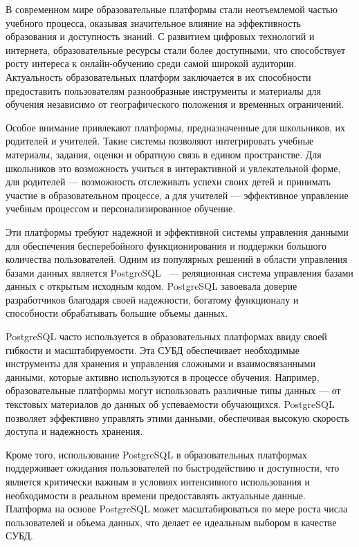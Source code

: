 \introduction %

В современном мире образовательные платформы стали неотъемлемой частью учебного процесса, оказывая значительное влияние на эффективность образования и доступность знаний. С развитием цифровых технологий и интернета, образовательные ресурсы стали более доступными, что способствует росту интереса к онлайн-обучению среди самой широкой аудитории. Актуальность образовательных платформ заключается в их способности предоставить пользователям разнообразные инструменты и материалы для обучения независимо от географического положения и временных ограничений.

Особое внимание привлекают платформы, предназначенные для школьников, их родителей и учителей. Такие системы позволяют интегрировать учебные материалы, задания, оценки и обратную связь в едином пространстве. Для школьников это возможность учиться в интерактивной и увлекательной форме, для родителей — возможность отслеживать успехи своих детей и принимать участие в образовательном процессе, а для учителей — эффективное управление учебным процессом и персонализированное обучение.

Эти платформы требуют надежной и эффективной системы управления данными для обеспечения бесперебойного функционирования и поддержки большого количества пользователей. Одним из популярных решений в области управления базами данных является PostgreSQL~\cite{postgresql} — реляционная система управления базами данных с открытым исходным кодом. PostgreSQL завоевала доверие разработчиков благодаря своей надежности, богатому функционалу и способности обрабатывать большие объемы данных.

PostgreSQL часто используется в образовательных платформах ввиду своей гибкости и масштабируемости. Эта СУБД обеспечивает необходимые инструменты для хранения и управления сложными и взаимосвязанными данными, которые активно используются в процессе обучения. Например, образовательные платформы могут использовать различные типы данных — от текстовых материалов до данных об успеваемости обучающихся. PostgreSQL позволяет эффективно управлять этими данными, обеспечивая высокую скорость доступа и надежность хранения.

Кроме того, использование PostgreSQL в образовательных платформах поддерживает ожидания пользователей по быстродействию и доступности, что является критически важным в условиях интенсивного использования и необходимости в реальном времени предоставлять актуальные данные. Платформа на основе PostgreSQL может масштабироваться по мере роста числа пользователей и объема данных, что делает ее идеальным выбором в качестве СУБД.

